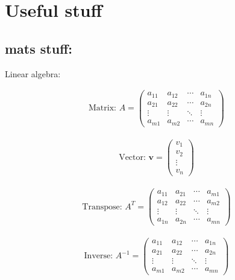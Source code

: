 \documentclass{config/homework}
\begin{document}
    \section{Useful stuff}\label{sec:section2}
    \subsection{mats stuff:}\label{subsec:b}

    Linear algebra:

    \[
    \begin{array}{l}
        \text{Matrix: } A =
        \begin{pmatrix}
            a_{11} & a_{12} & \cdots & a_{1n} \\
            a_{21} & a_{22} & \cdots & a_{2n} \\
            \vdots & \vdots & \ddots & \vdots \\
            a_{m1} & a_{m2} & \cdots & a_{mn}
        \end{pmatrix}
    \end{array}
    \]

    \[
    \begin{array}{l}
    \text{Vector: } \mathbf{v} =
        \begin{pmatrix}
        v_1 \\
        v_2 \\
        \vdots \\
        v_n
        \end{pmatrix}
    \end{array}
    \]

    \[
    \begin{array}{l}
    \text{Transpose: } A^T =
        \begin{pmatrix}
            a_{11} & a_{21} & \cdots & a_{m1} \\
            a_{12} & a_{22} & \cdots & a_{m2} \\
            \vdots & \vdots & \ddots & \vdots \\
            a_{1n} & a_{2n} & \cdots & a_{mn}
        \end{pmatrix}
    \end{array}
    \]

    \[
    \begin{array}{l}
    \text{Inverse: } A^{-1} =
        \begin{pmatrix}
            a_{11} & a_{12} & \cdots & a_{1n} \\
            a_{21} & a_{22} & \cdots & a_{2n} \\
            \vdots & \vdots & \ddots & \vdots \\
            a_{m1} & a_{m2} & \cdots & a_{mn}
        \end{pmatrix}
    \end{array}
    \]
\end{document}
